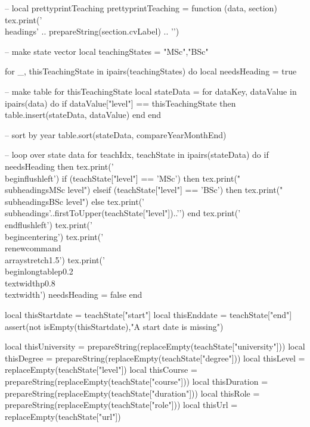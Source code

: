 \documentclass[letterpaper, 10pt]{article}
\newcommand{\headings}[1]{\section*{#1} \hrule \vspace{10pt}}
\newcommand{\subheadings}[1]{\textbf{#1} \vspace{5pt}}
\begin{document}
\begin{luacode}
	-- local prettyprintTeaching
	prettyprintTeaching = function (data, section)
		tex.print('\\headings{' .. prepareString(section.cvLabel) .. '}')

		-- make state vector
		local teachingStates = {"MSc","BSc"}

		for _, thisTeachingState in ipairs(teachingStates) do
			local needsHeading = true

			-- make table for thisTeachingState
			local stateData = {}
			for dataKey, dataValue in ipairs(data) do
				if dataValue["level"] == thisTeachingState then
					table.insert(stateData, dataValue)
				end
			end

			-- sort by year
			table.sort(stateData, compareYearMonthEnd)

			-- loop over state data
			for teachIdx, teachState in ipairs(stateData) do
				if needsHeading then
					tex.print('\\begin{flushleft}')
					if (teachState["level"] == 'MSc') then
						tex.print("\\subheadings{MSc level}")
					elseif (teachState["level"] == 'BSc') then
						tex.print("\\subheadings{BSc level}")
					else
						tex.print('\\subheadings{'..firstToUpper(teachState["level"])..'}')
					end
					tex.print('\\end{flushleft}')
					tex.print('\\begin{centering}')
					tex.print('\\renewcommand{\\arraystretch}{1.5}')
					tex.print('\\begin{longtable}{p{0.2\\textwidth}p{0.8\\textwidth}}')
					needsHeading = false
				end

				local thisStartdate = teachState["start"]
				local thisEnddate   = teachState["end"]
				assert(not isEmpty(thisStartdate),"A start date is missing")

				local thisUniversity = prepareString(replaceEmpty(teachState["university"]))
				local thisDegree	 = prepareString(replaceEmpty(teachState["degree"]))
				local thisLevel 	= replaceEmpty(teachState["level"])
				local thisCourse 	= prepareString(replaceEmpty(teachState["course"]))
				local thisDuration 	= prepareString(replaceEmpty(teachState["duration"]))
				local thisRole 		= prepareString(replaceEmpty(teachState["role"]))
				local thisUrl 		= replaceEmpty(teachState["url"])


\end{luacode}
\end{document}

